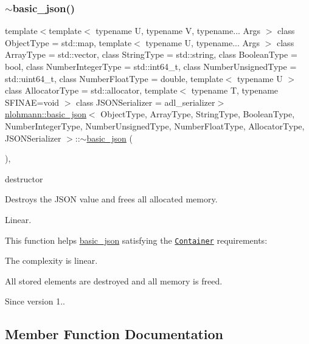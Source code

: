 \subsubsection{\texorpdfstring{$\sim$basic\+\_\+json()}{~basic\_json()}}
{\footnotesize\ttfamily template$<$template$<$ typename U, typename V, typename... Args $>$ class Object\+Type = std\+::map, template$<$ typename U, typename... Args $>$ class Array\+Type = std\+::vector, class String\+Type  = std\+::string, class Boolean\+Type  = bool, class Number\+Integer\+Type  = std\+::int64\+\_\+t, class Number\+Unsigned\+Type  = std\+::uint64\+\_\+t, class Number\+Float\+Type  = double, template$<$ typename U $>$ class Allocator\+Type = std\+::allocator, template$<$ typename T, typename S\+F\+I\+N\+A\+E=void $>$ class J\+S\+O\+N\+Serializer = adl\+\_\+serializer$>$ \\
\mbox{\hyperlink{classnlohmann_1_1basic__json}{nlohmann\+::basic\+\_\+json}}$<$ Object\+Type, Array\+Type, String\+Type, Boolean\+Type, Number\+Integer\+Type, Number\+Unsigned\+Type, Number\+Float\+Type, Allocator\+Type, J\+S\+O\+N\+Serializer $>$\+::$\sim$\mbox{\hyperlink{classnlohmann_1_1basic__json}{basic\+\_\+json}} (\begin{DoxyParamCaption}{ }\end{DoxyParamCaption})\hspace{0.3cm}{\ttfamily [inline]}, {\ttfamily [noexcept]}}



destructor 

Destroys the J\+S\+ON value and frees all allocated memory.

Linear.

This function helps {\ttfamily \mbox{\hyperlink{classnlohmann_1_1basic__json}{basic\+\_\+json}}} satisfying the \href{https://en.cppreference.com/w/cpp/named_req/Container}{\tt Container} requirements\+:
\begin{DoxyItemize}
\item The complexity is linear.
\item All stored elements are destroyed and all memory is freed.
\end{DoxyItemize}

\begin{DoxySince}{Since}
version 1.. 
\end{DoxySince}


\subsection{Member Function Documentation}
\mbox{\label{classnlohmann_1_1basic__json_a8a7d537fc297bbc5b845f92fe0445e3b}} 
